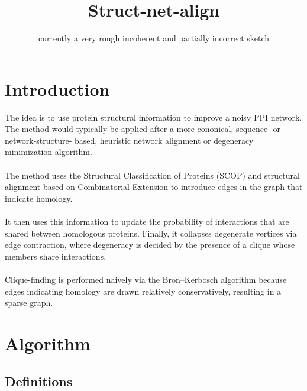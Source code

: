 \documentclass[11pt]{article}
\title{\textbf{Struct-net-align}}
\date{currently a very rough incoherent and partially incorrect sketch}
\begin{document}
\maketitle

\section*{Introduction}
The idea is to use protein structural information to improve a noisy PPI network. The method would typically be applied after a more cononical, sequence- or network-structure- based, heuristic network alignment or degeneracy minimization algorithm.\\\\
The method uses the Structural Classification of Proteins (SCOP) and structural alignment based on Combinatorial Extension to introduce edges in the graph that indicate homology.\\\\
It then uses this information to update the probability of interactions that are shared between homologous proteins. Finally, it collapses degenerate vertices via edge contraction, where degeneracy is decided by the presence of a clique whose members share interactions.\\\\
Clique-finding is performed naively via the Bron--Kerbosch algorithm because edges indicating homology are drawn relatively conservatively, resulting in a sparse graph.

\section*{Algorithm}

\subsection*{Definitions}
\end{document}
